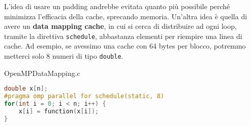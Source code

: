 L'idea di usare un padding andrebbe evitata quanto più possibile perché minimizza l'efficacia della cache, sprecando memoria. Un'altra idea è quella di avere un \textbf{data mapping cache}, in cui si cerca di distribuire ad ogni loop, tramite la direttiva \verb|schedule|, abbastanza elementi per riempire una linea di cache. Ad esempio, se avessimo una cache con 64 bytes per blocco, potremmo metterci solo 8 numeri di tipo \verb|double|.

\begin{codeblock}{OpenMPDataMapping.c}
    \begin{lstlisting}[language = C]
double x[n];
#pragma omp parallel for schedule(static, 8)
for(int i = 0; i < n; i++) {
    x[i] = function(x[i]);
}\end{lstlisting}
\end{codeblock}